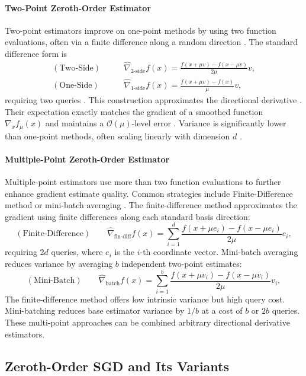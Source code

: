 \documentclass{article}
\newcommand{\calO}{\mathcal{O}}
\theoremstyle{definition}
\theoremstyle{plain}
\theoremstyle{remark}
\begin{document}
\paragraph{Two-Point Zeroth-Order Estimator} Two-point estimators improve on one-point methods by using two function evaluations, often via a finite difference along a random direction \citep{shamir2017optimal}. The standard difference form is 
\begin{align*}
    (\text{Two-Side})\qquad &\hat{\nabla}_{\text{2-side}} f(x) = \frac{f(x + \mu v)  - f(x-\mu v)}{2\mu} v, \\
    (\text{One-Side})\qquad &\hat{\nabla}_{\text{1-side}} f(x) =  \frac{f(x + \mu v)  - f(x )}{\mu} v,
\end{align*} 
requiring two queries \citep{shamir2017optimal,nesterov2017random}. This construction approximates the directional derivative \citep{chen2020unbiased}. Their expectation exactly matches the gradient of a smoothed function $\nabla_x f_\mu(x)$ \citep{nesterov2017random} and maintains a $\calO(\mu)$-level error \citep{ma2025revisiting}. Variance is significantly lower than one-point methods, often scaling linearly with dimension $d$ \citep{duchi2015optimal, berahas2022theoretical}. 

\paragraph{Multiple-Point Zeroth-Order Estimator} Multiple-point estimators use more than two function evaluations to further enhance gradient estimate quality. Common strategies include Finite-Difference method \citep{dai2015convergence} or mini-batch averaging \citep{duchi2015optimal}. The finite-difference method approximates the gradient using finite differences along each standard basis direction:
$$(\text{Finite-Difference})\qquad \hat{\nabla}_{\text{fin-diff}} f(x) = \sum_{i=1}^d \frac{f(x + \mu e_i)  - f(x-\mu e_i)}{2\mu} e_i, $$
requiring $2d$ queries, where $e_i$ is the $i$-th coordinate vector. Mini-batch averaging reduces variance by averaging $b$ independent two-point estimates: 
$$(\text{Mini-Batch})\qquad \hat{\nabla}_{\text{batch}} f(x) = \sum_{i=1}^b \frac{f(x + \mu v_i)  - f(x-\mu v_i)}{2\mu} v_i, $$
The finite-difference method offers low intrinsic variance but high query cost. Mini-batching reduces base estimator variance by $1/b$ at a cost of $b$ or $2b$ queries. These multi-point approaches can be combined arbitrary directional derivative estimators. 


\subsection{Zeroth-Order SGD and Its Variants} 
\end{document}
